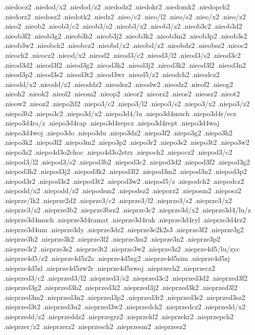 {.niedocz2
.niedod/x2
.niedod/z2
.niedodz2
.niedokr2
.niedomk2
.niedopch2
.niedorz2
.niedosz2
.niedotk2
.niedz2
.nieo/c2
.nieo/l2
.nieo/s2
.nieo/x2
.nieo/z2
.nieo2
.nieob2
.nieob3/c2
.nieob3/s2
.nieob3/x2
.nieob3/z2
.nieob3c2
.nieob3d2
.nieob3f2
.nieob3g2
.nieob3h2
.nieob3j2
.nieob3k2
.nieob3m2
.nieob3p2
.nieob3s2
.nieob3w2
.nieobch2
.nieobcz2
.nieobd/x2
.nieobd/z2
.nieobdz2
.nieobsz2
.nieoc2
.nieoch2
.nieocz2
.nieod/x2
.nieod2
.nieod3/c2
.nieod3/l2
.nieod3/s2
.nieod3c2
.nieod3d2
.nieod3f2
.nieod3g2
.nieod3h2
.nieod3j2
.nieod3k2
.nieod3l2
.nieod3n2
.nieod3p2
.nieod3s2
.nieod3t2
.nieod3wr
.nieod5/z2
.nieodch2
.nieodcz2
.nieodd/x2
.nieodd/z2
.nieoddz2
.nieodsz2
.nieodw2
.nieodz2
.nieof2
.nieog2
.nieoh2
.nieok2
.nieol2
.nieom2
.nieop2
.nieor2
.nieorz2
.nieos2
.nieosz2
.nieot2
.nieow2
.nieoz2
.niepo2d2
.niepo3/c2
.niepo3/l2
.niepo3/s2
.niepo3/x2
.niepo3/z2
.niepo3b2
.niepo3c2
.niepo3d/x2
.niepo3d4/lu
.niepo3d4much
.niepo3d4r/ecz
.niepo3d4ra/z
.niepo3d4rap
.niepo3d4repcz
.niepo3d4rept
.niepo3d4waj
.niepo3d4woj
.niepo3do
.niepo3du
.niepo3dz2
.niepo3f2
.niepo3g2
.niepo3h2
.niepo3k2
.niepo3l2
.niepo3m2
.niepo3p2
.niepo3r2
.niepo3s2
.niepo3t2
.niepo3w2
.niepo3z2
.niepo4d3o2choc
.niepo4d3o2strz
.niepoch2
.niepocz2
.niepod3/c2
.niepod3/l2
.niepod3/s2
.niepod3b2
.niepod3c2
.niepod3d2
.niepod3f2
.niepod3g2
.niepod3h2
.niepod3j2
.niepod3k2
.niepod3l2
.niepod3m2
.niepod3n2
.niepod3p2
.niepod3r2
.niepod3s2
.niepod3t2
.niepod3w2
.niepod5/z
.niepodch2
.niepodcz2
.niepodd/x2
.niepodd/z2
.niepodsm2
.niepodsz2
.nieporz2
.nieposm2
.nieposz2
.nieprze/lk2
.nieprze2d2
.nieprze3/c2
.nieprze3/l2
.nieprze3/s2
.nieprze3/x2
.nieprze3/z2
.nieprze3b2
.nieprze3brz2
.nieprze3c2
.nieprze3d/x2
.nieprze3d4/lu/z
.nieprze3d4much
.nieprze3d4ramat
.nieprze3d4ruk
.nieprze3d4ryl
.nieprze3d4rz2
.nieprze3d4um
.nieprze3dy
.nieprze3dz2
.nieprze3e2k2s3
.nieprze3f2
.nieprze3g2
.nieprze3h2
.nieprze3k2
.nieprze3l2
.nieprze3m2
.nieprze3n2
.nieprze3p2
.nieprze3r2
.nieprze3s2
.nieprze3t2
.nieprze3w2
.nieprze3z2
.nieprze4d5/lu/zyc
.nieprze4d5/z2
.nieprze4d5z2a
.nieprze4d5zg2
.nieprze4d5zim
.nieprze4d5zj
.nieprze4d5zl
.nieprze4d5zw2r
.nieprze4d5zwoj
.nieprzech2
.nieprzecz2
.nieprzed3/c2
.nieprzed3/l2
.nieprzed3/s2
.nieprzed3c2
.nieprzed3d2
.nieprzed3f2
.nieprzed3g2
.nieprzed3h2
.nieprzed3i2
.nieprzed3j2
.nieprzed3k2
.nieprzed3l2
.nieprzed3m2
.nieprzed3n2
.nieprzed3p2
.nieprzed3r2
.nieprzed3s2
.nieprzed3sz2
.nieprzed3t2
.nieprzed3u2
.nieprzed3w2
.nieprzedch2
.nieprzedcz2
.nieprzedd/x2
.nieprzedd/z2
.nieprzeddz2
.nieprzegrz2
.nieprzekl2
.nieprzekr2
.nieprzepch2
.nieprzer/z2
.nieprzerz2
.nieprzesch2
.nieprzesm2
.nieprzesz2
}
